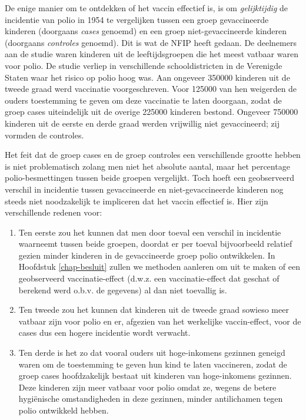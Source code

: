 \documentclass[
  12pt,dutch,coursenotes]{book}
\providecommand{\tightlist}{%
  \setlength{\itemsep}{0pt}\setlength{\parskip}{0pt}}
\begin{document}
De enige manier om te ontdekken of het vaccin effectief is, is om \emph{gelijktijdig} de incidentie van polio in 1954 te vergelijken tussen een
groep gevaccineerde kinderen (doorgaans \emph{cases} genoemd) en een groep
niet-gevaccineerde kinderen (doorgaans \emph{controles} genoemd). Dit is
wat de NFIP heeft gedaan. De deelnemers aan de studie waren kinderen uit de
leeftijdsgroepen die het meest vatbaar waren voor polio. De studie verliep in
verschillende schooldistricten in de Verenigde Staten waar het risico op
polio hoog was. Aan ongeveer 350000 kinderen uit de tweede graad werd
vaccinatie voorgeschreven. Voor 125000 van hen weigerden de ouders
toestemming te geven om deze vaccinatie te laten doorgaan, zodat de groep
cases uiteindelijk uit de overige 225000 kinderen bestond. Ongeveer
750000 kinderen uit de eerste en derde graad werden vrijwillig niet
gevaccineerd; zij vormden de controles.

Het feit dat de groep cases en de groep controles een verschillende grootte
hebben is niet problematisch zolang men niet het absolute aantal, maar het
percentage polio-besmettingen tussen beide groepen vergelijkt. Toch hoeft
een geobserveerd verschil in incidentie tussen gevaccineerde en
niet-gevaccineerde kinderen nog steeds niet noodzakelijk te impliceren dat
het vaccin effectief is. Hier zijn verschillende redenen voor:

\begin{enumerate}
\def\labelenumi{\arabic{enumi}.}
\tightlist
\item
  Ten eerste zou het kunnen dat men door toeval een verschil in
  incidentie waarneemt tussen beide groepen, doordat er per toeval
  bijvoorbeeld relatief gezien minder kinderen in de gevaccineerde groep polio
  ontwikkelen. In Hoofdstuk \ref{chap-besluit} zullen we methoden aanleren om
  uit te maken of een geobserveerd vaccinatie-effect (d.w.z. een
  vaccinatie-effect dat geschat of berekend werd o.b.v. de gegevens) al dan
  niet toevallig is.
\item
  Ten tweede zou het kunnen dat kinderen uit de tweede graad sowieso
  meer vatbaar zijn voor polio en er, afgezien van het werkelijke
  vaccin-effect, voor de cases dus een hogere incidentie wordt verwacht.
\item
  Ten derde is het zo dat vooral ouders uit hoge-inkomens gezinnen
  geneigd waren om de toestemming te geven hun kind te laten vaccineren, zodat
  de groep cases hoofdzakelijk bestaat uit kinderen van hoge-inkomens
  gezinnen. Deze kinderen zijn meer vatbaar voor polio omdat ze, wegens de
  betere hygiënische omstandigheden in deze gezinnen, minder antilichamen
  tegen polio ontwikkeld hebben.
\end{enumerate}
\end{document}
